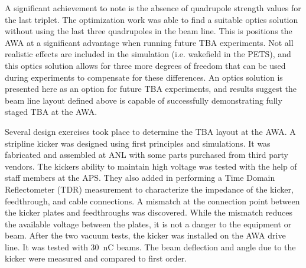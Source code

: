 A significant achievement to note is the absence of quadrupole strength values for the last triplet.
The optimization work was able to find a suitable optics solution without using the last three quadrupoles 
in the beam line. This is positions the AWA at a significant advantage when running future TBA experiments.
Not all realistic effects are included in the simulation (i.e. wakefield in the PETS), 
and this optics solution allows for three more degrees of freedom that can be used during experiments 
to compensate for these differences. An optics solution is presented here 
as an option for future TBA experiments, and results suggest the beam line layout 
defined above is capable of successfully demonstrating fully staged TBA at the AWA.


Several design exercises took place to determine the TBA layout at the AWA. 
A stripline kicker was designed using first principles and simulations. 
It was fabricated and assembled at ANL with some parts purchased from third party vendors.
The kickers ability to maintain high voltage was tested with the help of staff members at the APS.
They also added in performing a Time Domain Reflectometer (TDR) measurement to characterize 
the impedance of the kicker, feedthrough, and cable connections. 
A mismatch at the connection point between the kicker plates and feedthroughs was discovered.
While the mismatch reduces the available voltage between the plates, it is not a danger to 
the equipment or beam. After the two  vacuum tests, the kicker was installed on 
the AWA drive line. It was tested with \SI{30}{nC} beams. 
The beam deflection and angle due to the kicker were measured and 
compared to first order. 


